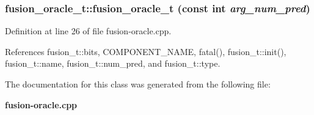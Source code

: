 \subsubsection[{fusion\_\-oracle\_\-t}]{\setlength{\rightskip}{0pt plus 5cm}fusion\_\-oracle\_\-t::fusion\_\-oracle\_\-t (const int {\em arg\_\-num\_\-pred})\hspace{0.3cm}{\tt  [inline]}}\label{classfusion__oracle__t_1d1c8762be0084d506cdd885f6434367}




Definition at line 26 of file fusion-oracle.cpp.

References fusion\_\-t::bits, COMPONENT\_\-NAME, fatal(), fusion\_\-t::init(), fusion\_\-t::name, fusion\_\-t::num\_\-pred, and fusion\_\-t::type.

The documentation for this class was generated from the following file:\begin{CompactItemize}
\item 
{\bf fusion-oracle.cpp}\end{CompactItemize}
